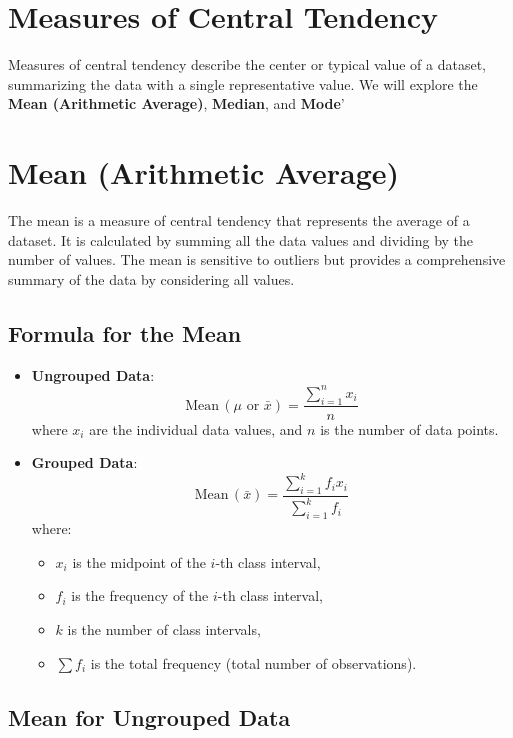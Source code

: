 \documentclass[11pt]{article}
\begin{document}
\section*{Measures of Central Tendency}

Measures of central tendency describe the center or typical value of a dataset, summarizing the data with a single representative value. We will explore the \textbf{Mean (Arithmetic Average)}, \textbf{Median}, and \textbf{Mode}'

\section{Mean (Arithmetic Average)}

The mean is a measure of central tendency that represents the average of a dataset. It is calculated by summing all the data values and dividing by the number of values. The mean is sensitive to outliers but provides a comprehensive summary of the data by considering all values.

\subsection*{Formula for the Mean}

\begin{itemize}
    \item \textbf{Ungrouped Data}:
    \[
    \text{Mean} \, (\mu \text{ or } \bar{x}) = \frac{\sum_{i=1}^{n}x_i}{n}
    \]
    where $x_i$ are the individual data values, and $n$ is the number of data points.

    \item \textbf{Grouped Data}:
    \[
    \text{Mean} \, (\bar{x}) = \frac{\sum_{i=1}^{k}f_i x_i}{\sum_{i=1}^{k}f_i}
    \]
    where:
    \begin{itemize}
        \item $x_i$ is the midpoint of the $i$-th class interval,
        \item $f_i$ is the frequency of the $i$-th class interval,
        \item $k$ is the number of class intervals,
        \item $\sum f_i$ is the total frequency (total number of observations).
    \end{itemize}
\end{itemize}

\subsection{Mean for Ungrouped Data}
\end{document}
